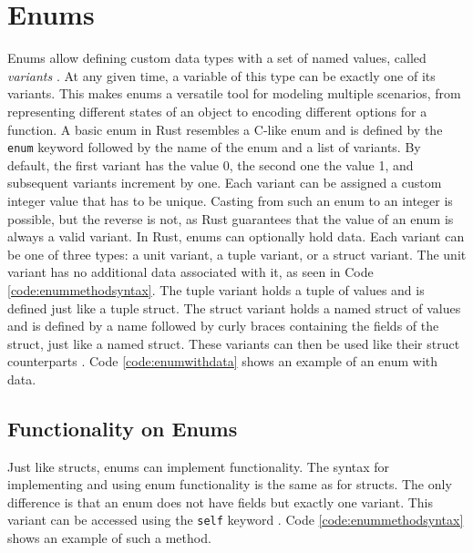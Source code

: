 \section{Enums}
Enums allow defining custom data types with a set of named values, called \textit{variants} \cite[230]{Blandy_Jim2021-07-20}.
At any given time, a variable of this type can be exactly one of its variants.
\noindent This makes enums a versatile tool for modeling multiple scenarios, from representing different states of an object to encoding different options for a function.
A basic enum in Rust resembles a C-like enum and is defined by the \texttt{enum} keyword followed by the name of the enum and a list of variants.
By default, the first variant has the value 0, the second one the value 1, and subsequent variants increment by one.
\noindent Each variant can be assigned a custom integer value that has to be unique.
Casting from such an enum to an integer is possible, but the reverse is not, as Rust guarantees that the value of an enum is always a valid variant.
\noindent In Rust, enums can optionally hold data.
Each variant can be one of three types: a unit variant, a tuple variant, or a struct variant.
The unit variant has no additional data associated with it, as seen in Code \ref{code:enummethodsyntax}.
The tuple variant holds a tuple of values and is defined just like a tuple struct.
The struct variant holds a named struct of values and is defined by a name followed by curly braces containing the fields of the struct, just like a named struct.
These variants can then be used like their struct counterparts \cite[Chapter~6.7]{rustref} \cite[230-234]{Blandy_Jim2021-07-20}.
Code \ref{code:enumwithdata} shows an example of an enum with data.


\subsection{Functionality on Enums}
Just like structs, enums can implement functionality. The syntax for implementing and using enum functionality is the same as for structs.
The only difference is that an enum does not have fields but exactly one variant.
This variant can be accessed using the \texttt{self} keyword \cite[Chapter~6.1]{rustbook}.
Code \ref{code:enummethodsyntax} shows an example of such a method.


